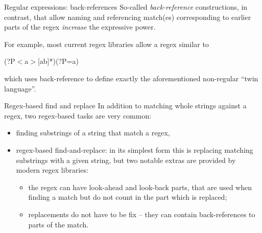 \documentclass[style=upen, size=14pt]{powerdot}
\newcommand{\gold}{\color{arany}}
\theoremstyle{definition}
\begin{document}
\begin{slide}[toc=]{Regular expressions: back-references}
  So-called \emph{\gold back-reference} constructions, in contrast, that allow
  naming and referencing match(es) corresponding to earlier parts of the regex
  \emph{increase} the expressive power.\bigskip

  For example, most current regex libraries allow a regex similar to\bigskip

  \begin{center}
    (?P$<$a$>$[ab]*)(?P=a)\bigskip
  \end{center}

  which uses back-reference to define exactly the aforementioned non-regular
  ``twin language''.
\end{slide}

\begin{slide}[toc=]{Regex-based find and replace}
  In addition to matching whole strings against a regex, two regex-based tasks are
  very common:
  \begin{itemize}
  \item finding substrings of a string that match a regex,
  \item regex-based find-and-replace: in its simplest form this is replacing
    matching substrings with a given string, but two notable
    extras are provided by modern regex libraries:
    \begin{itemize}
    \item the regex can have look-ahead and look-back parts, that are used when
      finding a match but do not count in the part which is replaced;
    \item replacements do not have to be fix -- they can contain back-references
      to parts of the match.
    \end{itemize}
  \end{itemize}
\end{slide}
\end{document}
